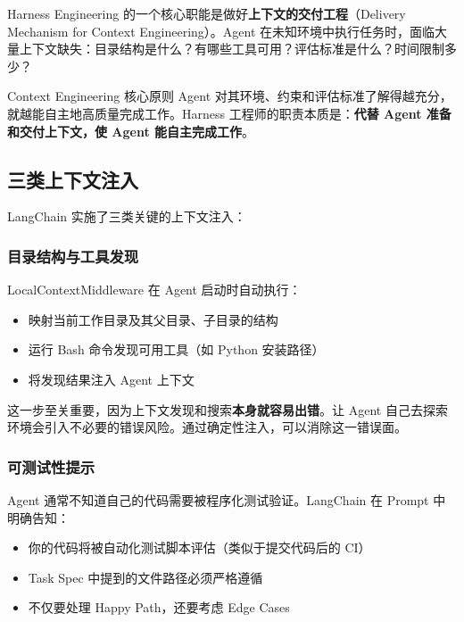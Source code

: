 \documentclass[a4paper]{article}
\begin{document}
Harness Engineering 的一个核心职能是做好\textbf{上下文的交付工程}（Delivery Mechanism for Context Engineering）。Agent 在未知环境中执行任务时，面临大量上下文缺失：目录结构是什么？有哪些工具可用？评估标准是什么？时间限制多少？

\begin{importantbox}{Context Engineering 核心原则}
Agent 对其环境、约束和评估标准了解得越充分，就越能自主地高质量完成工作。Harness 工程师的职责本质是：\textbf{代替 Agent 准备和交付上下文，使 Agent 能自主完成工作}。
\end{importantbox}

\subsection{三类上下文注入}

LangChain 实施了三类关键的上下文注入：

\subsubsection{目录结构与工具发现}

LocalContextMiddleware 在 Agent 启动时自动执行：
\begin{itemize}[leftmargin=1.5em]
    \item 映射当前工作目录及其父目录、子目录的结构
    \item 运行 Bash 命令发现可用工具（如 Python 安装路径）
    \item 将发现结果注入 Agent 上下文
\end{itemize}

这一步至关重要，因为上下文发现和搜索\textbf{本身就容易出错}。让 Agent 自己去探索环境会引入不必要的错误风险。通过确定性注入，可以消除这一错误面。

\subsubsection{可测试性提示}

Agent 通常不知道自己的代码需要被程序化测试验证。LangChain 在 Prompt 中明确告知：
\begin{itemize}[leftmargin=1.5em]
    \item 你的代码将被自动化测试脚本评估（类似于提交代码后的 CI）
    \item Task Spec 中提到的文件路径必须严格遵循
    \item 不仅要处理 Happy Path，还要考虑 Edge Cases
\end{itemize}
\end{document}
